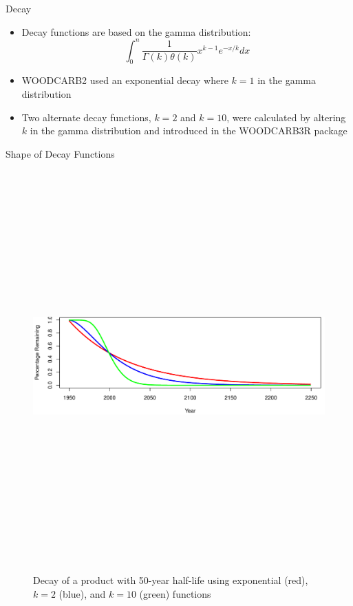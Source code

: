 \documentclass[final]{beamer}\usepackage[]{graphicx}\usepackage[]{color}
\newlength{\onecolwid}
\newlength{\twocolwid}
\begin{document}
\begin{frame}[t]
\begin{columns}[t]
\begin{column}{\twocolwid}
\begin{columns}[t,totalwidth=\twocolwid]
\begin{column}{\onecolwid}
\begin{block}{Decay}
\begin{itemize}
\item Decay functions are based on the gamma distribution:
$$\int_{0}^{n}\frac{1}{\Gamma(k)\theta(k)}x^{k-1}e^{-x/k}dx$$
\item WOODCARB2 used an exponential decay where $k=1$ in the gamma distribution
\item Two alternate decay functions, $k=2$ and $k=10$, were calculated by altering $k$ in the gamma distribution and introduced in the WOODCARB3R package
\end{itemize}
\end{block}
\begin{block}{Shape of Decay Functions}
\begin{center}
\vspace{-2cm}
\begin{figure}
    {\includegraphics[width=1\linewidth, height=15cm]{DecayPlotExample.pdf}}
    \caption{Decay of a product with 50-year half-life using exponential (red), $k=2$ (blue), and $k=10$ (green) functions}
\end{figure}
\end{center}


\end{block}
\end{column}
\end{columns}
\end{column}
\end{columns}
\end{frame}
\end{document}
